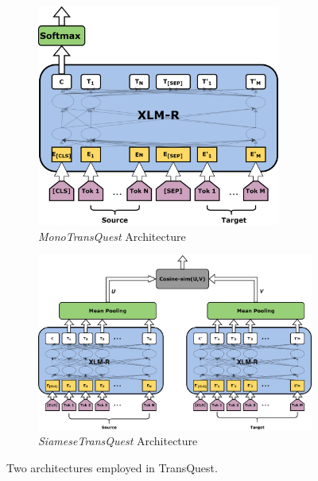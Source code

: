 \begin{figure}[!ht]
	\centering
	\begin{subfigure}[b]{10cm}
		\centering\includegraphics[width=8cm]{figures/translation_quality_estimation/TransQuest.png}
		\caption{\textit{MonoTransQuest} Architecture}
		\label{fig:monotransquest}
	\end{subfigure}
	\begin{subfigure}[b]{10cm}
		\centering\includegraphics[width=12cm]{figures/translation_quality_estimation/SiameseTransQuest.png}
		\caption{\textit{SiameseTransQuest} Architecture}
		\label{fig:siamesetransquest}
	\end{subfigure}
	
	\caption[Architectures in TransQuest]{Two architectures employed in TransQuest.}
	\label{fig:transquest_architecture}
\end{figure}

